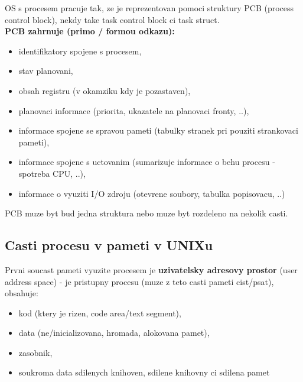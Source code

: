 \documentclass[a4paper, 11pt]{article}
\begin{document}
OS s procesem pracuje tak, ze je reprezentovan pomoci struktury PCB (process control block), nekdy take task control block ci task struct. \\

\textbf{PCB zahrnuje (primo / formou odkazu):}
\begin{itemize}
    \item identifikatory spojene s procesem,
    \item stav planovani,
    \item obsah registru (v okamziku kdy je pozastaven),
    \item planovaci informace (priorita, ukazatele na planovaci fronty, ..),
    \item informace spojene se spravou pameti (tabulky stranek pri pouziti strankovaci pameti),
    \item informace spojene s uctovanim (sumarizuje informace o behu procesu - spotreba CPU, ..),
    \item informace o vyuziti I/O zdroju (otevrene soubory, tabulka popisovacu, ..) \\
\end{itemize}

PCB muze byt bud jedna struktura nebo muze byt rozdeleno na nekolik casti. \\

\subsection{Casti procesu v pameti v UNIXu}
Prvni soucast pameti vyuzite procesem je \textbf{uzivatelsky adresovy prostor} (user address space) - je pristupny procesu (muze z teto casti pameti cist/psat), obsahuje:
\begin{itemize}
    \item kod (ktery je rizen, code area/text segment),
    \item data (ne/inicializovana, hromada, alokovana pamet),
    \item zasobnik,
    \item soukroma data sdilenych knihoven, sdilene knihovny ci sdilena pamet \\
\end{itemize}
\end{document}
